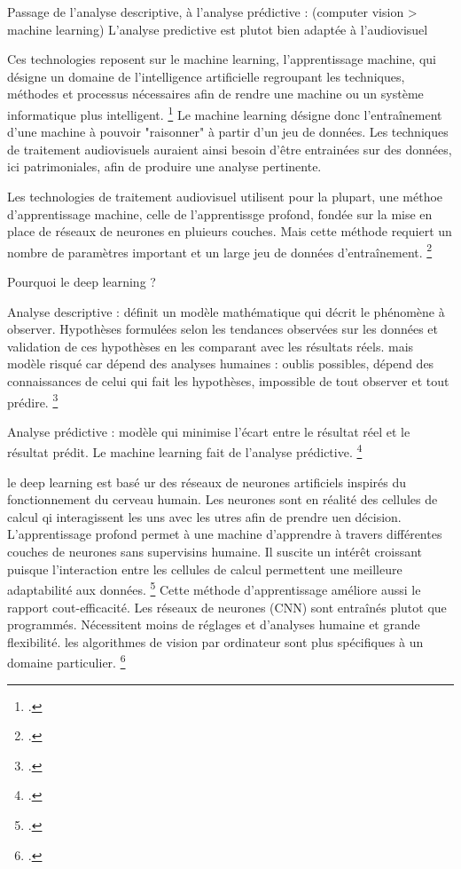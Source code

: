 Passage de l'analyse descriptive, à l'analyse prédictive : (computer vision > machine learning)
L'analyse predictive est plutot bien adaptée à l'audiovisuel 

Ces technologies reposent sur le machine learning, l'apprentissage machine, qui désigne un domaine de l'intelligence artificielle regroupant les techniques, méthodes et processus nécessaires afin de rendre une machine ou un système informatique plus intelligent. \footcite{zotero-item-584} Le machine learning désigne donc l'entraînement d'une machine à pouvoir "raisonner" à partir d'un jeu de données. Les techniques de traitement audiovisuels auraient ainsi besoin d'être entrainées sur des données, ici patrimoniales, afin de produire une analyse pertinente. 

Les technologies de traitement audiovisuel utilisent pour la plupart, une méthoe d'apprentissage machine, celle de l'apprentissge profond, fondée sur la mise en place de réseaux de neurones en pluieurs couches. Mais cette méthode requiert un nombre de paramètres important et un large jeu de données d'entraînement. \footcite{pattichis2023}

Pourquoi le deep learning ?

Analyse descriptive : 
définit un modèle mathématique qui décrit le phénomène à observer. Hypothèses formulées selon les tendances observées sur les données et validation de ces hypothèses en les comparant avec les résultats réels. mais modèle risqué car dépend des analyses humaines : oublis possibles, dépend des connaissances de celui qui fait les hypothèses, impossible de tout observer et tout prédire. \footcite{mahony2020}

Analyse prédictive : 
modèle qui minimise l'écart entre le résultat réel et le résultat prédit. Le machine learning fait de l'analyse prédictive. \footcite{mahony2020}

le deep learning est basé ur des réseaux de neurones artificiels inspirés du fonctionnement du cerveau humain. Les neurones sont en réalité des cellules de calcul qi interagissent les uns avec les utres afin de prendre uen décision. L'apprentissage profond permet à une machine d'apprendre à travers différentes couches de neurones sans supervisins humaine. Il suscite un intérêt croissant puisque l'interaction entre les cellules de calcul permettent une meilleure adaptabilité aux données. \footcite{mahony2020} Cette méthode d'apprentissage améliore aussi le rapport cout-efficacité. Les réseaux de neurones (CNN) sont entraînés plutot que programmés. Nécessitent moins de réglages et d'analyses humaine et grande flexibilité. les algorithmes de vision par ordinateur sont plus spécifiques à un domaine particulier. \footcite{mahony2020}

